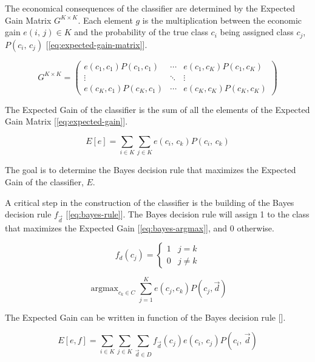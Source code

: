 \documentclass[letterpaper, conference]{IEEEtran}
\DeclareMathOperator*{\argmax}{argmax}
\begin{document}
The economical consequences of the classifier are determined by the Expected Gain Matrix $G^{K \times K}$. Each element $g$ is the multiplication between the economic gain $e(i,\, j) \in K$ and the probability of the true class $c_i$ being assigned class $c_j$, $P(c_i,\, c_j)$ [\ref{eq:expected-gain-matrix}].

\begin{equation}\label{eq:expected-gain-matrix}
  G^{K \times K} = \begin{pmatrix}
    e(c_1,c_1)P(c_1,c_1) & \cdots & e(c_1,c_K)P(c_1,c_K) \\
                \vdots   & \ddots &    \vdots   \\
    e(c_K,c_1)P(c_K,c_1) & \cdots & e(c_K,c_K)P(c_K,c_K)
  \end{pmatrix}
\end{equation}

The Expected Gain of the classifier is the sum of all the elements of the Expected Gain Matrix [\ref{eq:expected-gain}].

\begin{equation}\label{eq:expected-gain}
  E[e] = \sum_{i \in K} \sum_{j \in K}e(c_i,\,c_k)\mathbin{}P(c_i,\,c_k)
\end{equation}

The goal is to determine the Bayes decision rule that maximizes the Expected Gain of the classifier, $E$.

A critical step in the construction of the classifier is the building of the Bayes decision rule $f_{\vec{d}}$ [\ref{eq:bayes-rule}]. The Bayes decision rule will assign 1 to the class that maximizes the Expected Gain [\ref{eq:bayes-argmax}], and 0 otherwise.

\begin{equation}\label{eq:bayes-rule}
  f_d(c_j) =
  \begin{cases}
  1 & j = k \\
  0 & j \neq k
  \end{cases}
\end{equation}

\begin{equation}\label{eq:bayes-argmax}
  \argmax_{c_k \in C} \sum_{j = 1}^{K} e(c_j, c_k)\mathbin{}P(c_j, \vec{d})
\end{equation}

The Expected Gain can be written in function of the Bayes decision rule [\label{eq:bayes-expected-gain}].

\begin{equation}\label{eq:bayes-expected-gain}
  E[e, f] = \sum_{i \in K} \sum_{j \in K}\sum_{\vec{d} \in D}f_{\vec{d}}(c_j)\mathbin{}e(c_i,\, c_j)\mathbin{}P(c_i,\,\vec{d})
\end{equation}
\end{document}
